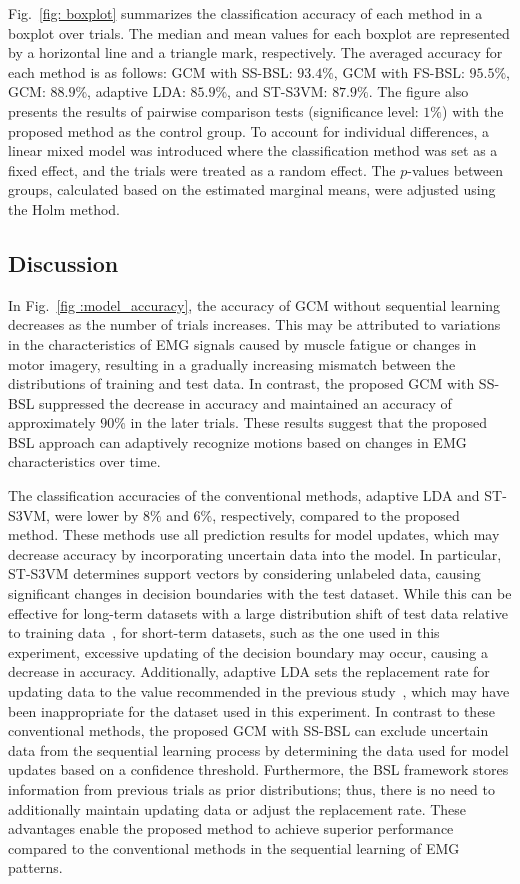\documentclass[letterpaper, 10 pt, conference]{ieeeconf}
\begin{document}
Fig.~\ref{fig: boxplot} summarizes the classification accuracy of each method in a boxplot over trials. 
The median and mean values for each boxplot are represented by a horizontal line and a triangle mark, respectively. 
The averaged accuracy for each method is as follows: GCM with SS-BSL: $93.4\%$, GCM with FS-BSL: $95.5\%$, GCM: $88.9\%$, adaptive LDA: $85.9\%$, and ST-S3VM: $87.9\%$. 
The figure also presents the results of pairwise comparison tests (significance level: $1\%$) with the proposed method as the control group. 
To account for individual differences, a linear mixed model was introduced where the classification method was set as a fixed effect, and the trials were treated as a random effect. 
The $p$-values between groups, calculated based on the estimated marginal means, were adjusted using the Holm method.


\subsection{Discussion}
In Fig.~\ref{fig :model_accuracy}, the accuracy of GCM without sequential learning decreases as the number of trials increases. 
This may be attributed to variations in the characteristics of EMG signals caused by muscle fatigue or changes in motor imagery, resulting in a gradually increasing mismatch between the distributions of training and test data. 
In contrast, the proposed GCM with SS-BSL suppressed the decrease in accuracy and maintained an accuracy of approximately $90\%$ in the later trials. 
These results suggest that the proposed BSL approach can adaptively recognize motions based on changes in EMG characteristics over time.

The classification accuracies of the conventional methods, adaptive LDA and ST-S3VM, were lower by $8\%$ and $6\%$, respectively, compared to the proposed method. 
These methods use all prediction results for model updates, which may decrease accuracy by incorporating uncertain data into the model. 
In particular, ST-S3VM determines support vectors by considering unlabeled data, causing significant changes in decision boundaries with the test dataset.
While this can be effective for long-term datasets with a large distribution shift of test data relative to training data~\cite{okawa2022sequential}, for short-term datasets, such as the one used in this experiment, excessive updating of the decision boundary may occur, causing a decrease in accuracy. 
Additionally, adaptive LDA sets the replacement rate for updating data to the value recommended in the previous study~\cite{zhang2013adaptation}, which may have been inappropriate for the dataset used in this experiment. 
In contrast to these conventional methods, the proposed GCM with SS-BSL can exclude uncertain data from the sequential learning process by determining the data used for model updates based on a confidence threshold. 
Furthermore, the BSL framework stores information from previous trials as prior distributions; thus, there is no need to additionally maintain updating data or adjust the replacement rate. 
These advantages enable the proposed method to achieve superior performance compared to the conventional methods in the sequential learning of EMG patterns.
\end{document}
